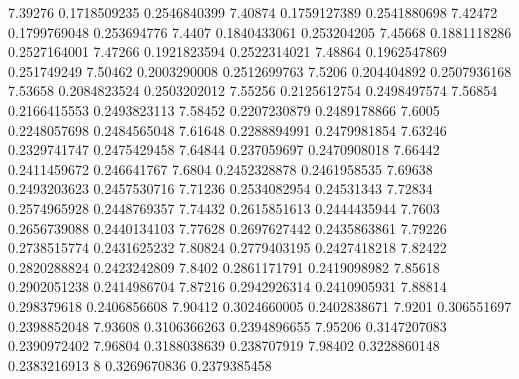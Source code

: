 {7.39276 0.1718509235 0.2546840399
7.40874 0.1759127389 0.2541880698
7.42472 0.1799769048 0.253694776
7.4407 0.1840433061 0.253204205
7.45668 0.1881118286 0.2527164001
7.47266 0.1921823594 0.2522314021
7.48864 0.1962547869 0.251749249
7.50462 0.2003290008 0.2512699763
7.5206 0.204404892 0.2507936168
7.53658 0.2084823524 0.2503202012
7.55256 0.2125612754 0.2498497574
7.56854 0.2166415553 0.2493823113
7.58452 0.2207230879 0.2489178866
7.6005 0.2248057698 0.2484565048
7.61648 0.2288894991 0.2479981854
7.63246 0.2329741747 0.2475429458
7.64844 0.237059697 0.2470908018
7.66442 0.2411459672 0.246641767
7.6804 0.2452328878 0.2461958535
7.69638 0.2493203623 0.2457530716
7.71236 0.2534082954 0.24531343
7.72834 0.2574965928 0.2448769357
7.74432 0.2615851613 0.2444435944
7.7603 0.2656739088 0.2440134103
7.77628 0.2697627442 0.2435863861
7.79226 0.2738515774 0.2431625232
7.80824 0.2779403195 0.2427418218
7.82422 0.2820288824 0.2423242809
7.8402 0.2861171791 0.2419098982
7.85618 0.2902051238 0.2414986704
7.87216 0.2942926314 0.2410905931
7.88814 0.298379618 0.2406856608
7.90412 0.3024660005 0.2402838671
7.9201 0.306551697 0.2398852048
7.93608 0.3106366263 0.2394896655
7.95206 0.3147207083 0.2390972402
7.96804 0.3188038639 0.238707919
7.98402 0.3228860148 0.2383216913
8 0.3269670836 0.2379385458
}\fittedfrequency

